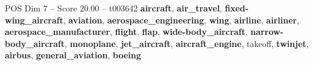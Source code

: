 \begin{textsample}{POS Dim 7 – Score 20.00 – t003642}  \label{ex:f7_pos_016}
\textbf{aircraft}, \textbf{air\_travel}, \textbf{fixed-wing\_aircraft}, \textbf{aviation}, \textbf{aerospace\_engineering}, \textbf{wing}, \textbf{airline}, \textbf{airliner}, \textbf{aerospace\_manufacturer}, \textbf{flight}, \textbf{flap}, \textbf{wide-body\_aircraft}, \textbf{narrow-body\_aircraft}, \textbf{monoplane}, \textbf{jet\_aircraft}, \textbf{aircraft\_engine}, takeoff, \textbf{twinjet}, \textbf{airbus}, \textbf{general\_aviation}, \textbf{boeing}

\end{textsample}
